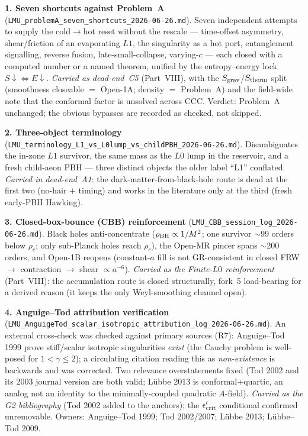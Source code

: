 \documentclass[11pt]{article}
\begin{document}
\smallskip\noindent\textbf{1. Seven shortcuts against Problem~A} (\texttt{LMU\_problemA\_seven\_shortcuts\_2026-06-26.md}). Seven independent attempts to supply the cold$\to$hot reset without the rescale --- time-offset asymmetry, shear/friction of an evaporating $L1$, the singularity as a hot port, entanglement signalling, reverse fusion, late-small-collapse, varying-$c$ --- each closed with a computed number or a named theorem, unified by the entropy--energy lock $S\!\downarrow\Leftrightarrow E\!\downarrow$. \emph{Carried as dead-end~C5} (Part~VIII), with the $S_{\rm grav}$/$S_{\rm therm}$ split (smoothness closeable $=$ Open-1A; density $=$ Problem~A) and the field-wide note that the conformal factor is unsolved across CCC. Verdict: Problem~A unchanged; the obvious bypasses are recorded as checked, not skipped.

\smallskip\noindent\textbf{2. Three-object terminology} (\texttt{LMU\_terminology\_L1\_vs\_L0lump\_vs\_childPBH\_2026-06-26.md}). Disambiguates the in-zone $L1$ survivor, the same mass as the $L0$ lump in the reservoir, and a fresh child-aeon PBH --- three distinct objects the older label ``L1'' conflated. \emph{Carried in dead-end~A1}: the dark-matter-from-black-hole route is dead at the first two (no-hair $+$ timing) and works in the literature only at the third (fresh early-PBH Hawking).

\smallskip\noindent\textbf{3. Closed-box-bounce (CBB) reinforcement} (\texttt{LMU\_CBB\_session\_log\_2026-06-26.md}). Black holes anti-concentrate ($\rho_{\rm BH}\propto1/M^2$; one survivor $\sim$99 orders below $\rho_c$; only sub-Planck holes reach $\rho_c$), the Open-MR pincer spans $\sim$200 orders, and Open-1B reopens (constant-$a$ fill is not GR-consistent in closed FRW $\to$ contraction $\to$ shear $\propto a^{-6}$). \emph{Carried as the Finite-$L0$ reinforcement} (Part~VIII): the accumulation route is closed structurally, fork~5 load-bearing for a derived reason (it keeps the only Weyl-smoothing channel open).

\smallskip\noindent\textbf{4. Anguige--Tod attribution verification} (\texttt{LMU\_AnguigeTod\_scalar\_isotropic\_attribution\_log\_2026-06-26.md}). An external cross-check was checked against primary sources (R7): Anguige--Tod 1999 prove stiff/scalar isotropic singularities \emph{exist} (the Cauchy problem is well-posed for $1<\gamma\le2$); a circulating citation reading this as \emph{non-existence} is backwards and was corrected. Two relevance overstatements fixed (Tod 2002 and its 2003 journal version are both valid; Lübbe 2013 is conformal$+$quartic, an analog not an identity to the minimally-coupled quadratic $A$-field). \emph{Carried as the G2 bibliography} (Tod 2002 added to the anchors); the $\epsilon'_{\rm crit}$ conditional confirmed unremovable. Owners: Anguige--Tod 1999; Tod 2002/2007; Lübbe 2013; Lübbe--Tod 2009.
\end{document}
